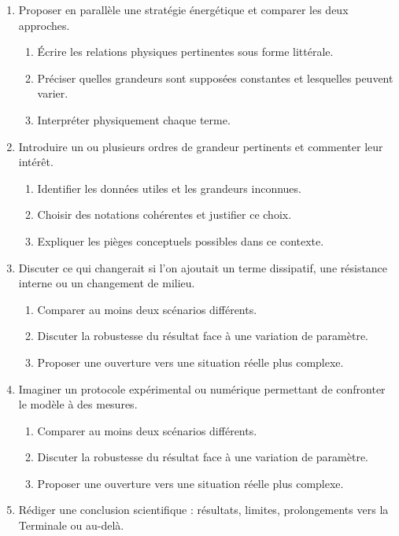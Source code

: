 \documentclass[11pt,a4paper]{article}
\begin{document}
\begin{enumerate}[label=\textbf{Très long \arabic*.},leftmargin=*]
\begin{enumerate}[label=\textbf{\arabic*)}]
\begin{enumerate}[label=\alph*)]
\end{enumerate}
\item Proposer en parallèle une stratégie énergétique et comparer les deux approches.
\begin{enumerate}[label=\alph*)]
\item Écrire les relations physiques pertinentes sous forme littérale.
\item Préciser quelles grandeurs sont supposées constantes et lesquelles peuvent varier.
\item Interpréter physiquement chaque terme.
\end{enumerate}
\item Introduire un ou plusieurs ordres de grandeur pertinents et commenter leur intérêt.
\begin{enumerate}[label=\alph*)]
\item Identifier les données utiles et les grandeurs inconnues.
\item Choisir des notations cohérentes et justifier ce choix.
\item Expliquer les pièges conceptuels possibles dans ce contexte.
\end{enumerate}
\item Discuter ce qui changerait si l'on ajoutait un terme dissipatif, une résistance interne ou un changement de milieu.
\begin{enumerate}[label=\alph*)]
\item Comparer au moins deux scénarios différents.
\item Discuter la robustesse du résultat face à une variation de paramètre.
\item Proposer une ouverture vers une situation réelle plus complexe.
\end{enumerate}
\item Imaginer un protocole expérimental ou numérique permettant de confronter le modèle à des mesures.
\begin{enumerate}[label=\alph*)]
\item Comparer au moins deux scénarios différents.
\item Discuter la robustesse du résultat face à une variation de paramètre.
\item Proposer une ouverture vers une situation réelle plus complexe.
\end{enumerate}
\item Rédiger une conclusion scientifique : résultats, limites, prolongements vers la Terminale ou au-delà.
\begin{enumerate}[label=\alph*)]

\end{enumerate}
\end{enumerate}
\end{enumerate}
\end{document}
